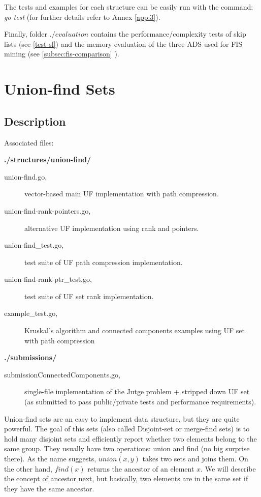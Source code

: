 \documentclass[a4paper,10pt,table,xcdraw]{article}
\begin{document}
The tests and examples for each structure can be easily run with the command: \textit{go test} (for further details refer to Annex \ref{app:3}).

Finally, folder $./evaluation$ contains the performance/complexity tests of skip lists (see \ref{test-sl}) and the memory evaluation of the three ADS used for FIS mining (see \ref{subsec:fis-comparison}
 ).



\section{Union-find Sets}
\label{sec:union-find}

\subsection{Description}

Associated files:

\textbf{./structures/union-find/}
\begin{description}
\item [\hspace{10mm} union-find.go,] vector-based main UF implementation with path compression.
\item [\hspace{10mm} union-find-rank-pointers.go,] alternative UF implementation using rank and pointers.
\item [\hspace{10mm} union-find\_test.go,] test suite of UF path compression implementation.
\item [\hspace{10mm} union-find-rank-ptr\_test.go,] test suite of UF set rank implementation.
\item [\hspace{10mm} example\_test.go,] Kruskal's algorithm and connected components examples using UF set with path compression
\end{description}
\textbf{./submissions/}
\begin{description}
\item [\hspace{10mm} submissionConnectedComponents.go,] single-file implementation of the Jutge problem + stripped down UF set (as submitted to pass public/private tests and performance requirements). 
\end{description}

Union-find sets are an easy to implement data structure, but they are quite powerful. The goal of this sets (also called Disjoint-set or merge-find sets) is to hold many disjoint sets and efficiently report whether two elements belong to the same group. They usually have two operations: union and find (no big surprise there). As the name suggests, $union(x, y)$ takes two sets and joins them. On the other hand, $find(x)$ returns the ancestor of an element $x$. We will describe the concept of ancestor next, but basically, two elements are in the same set if they have the same ancestor.
\end{document}
